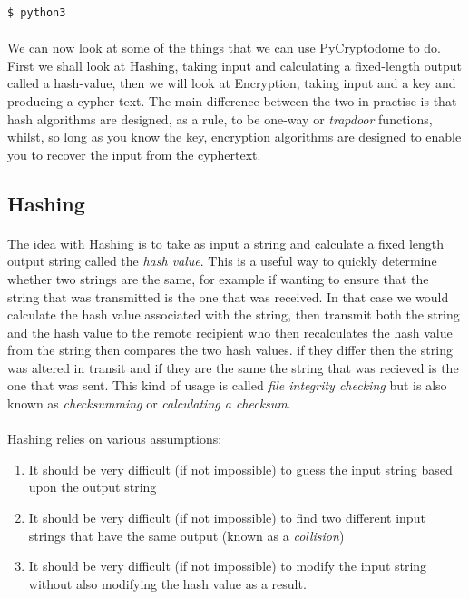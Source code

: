 \documentclass[12pt, a4paper, oneside]{book}
\begin{document}
{\begin{lstlisting}[style=DOS]
    $ python3
\end{lstlisting}

\paragraph{} We can now look at some of the things that we can use PyCryptodome to do. First we shall look at Hashing, taking input and calculating a fixed-length output called a hash-value, then we will look at Encryption, taking input and a key and producing a cypher text. The main difference between the two in practise is that hash algorithms are designed, as a rule, to be one-way or \emph{trapdoor} functions, whilst, so long as you know the key, encryption algorithms are designed to enable you to recover the input from the cyphertext.

\subsection{Hashing}
\paragraph{} The idea with Hashing is to take as input a string and calculate a fixed length output string called the \emph{hash value}. This is a useful way to quickly determine whether two strings are the same, for example if wanting to ensure that the string that was transmitted is the one that was received. In that case we would calculate the hash value associated with the string, then transmit both the string and the hash value to the remote recipient who then recalculates the hash value from the string then compares the two hash values. if they differ then the string was altered in transit and if they are the same the string that was recieved is the one that was sent. This kind of usage is called \emph{file integrity checking} but is also known as \emph{checksumming} or \emph{calculating a checksum}.

\paragraph{} Hashing relies on various assumptions:

\begin{enumerate}
\item It should be very difficult (if not impossible) to guess the input string based upon the output string
\item It should be very difficult (if not impossible) to find two different input strings that have the same output (known as a \emph{collision})
\item It should be very difficult (if not impossible) to modify the input string without also modifying the hash value as a result.
\end{enumerate}

}
\end{document}
